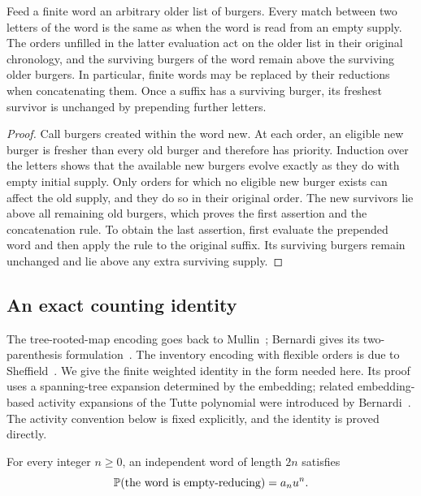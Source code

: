 \begin{lemma}\label{word:reduction}
Feed a finite word an arbitrary older list of burgers. Every match
between two letters of the word is the same as when the word is read
from an empty supply. The orders unfilled in the latter evaluation act
on the older list in their original chronology, and the surviving burgers
of the word remain above the surviving older burgers. In particular,
finite words may be replaced by their reductions when concatenating
them. Once a suffix has a surviving burger, its freshest survivor is
unchanged by prepending further letters.
\end{lemma}

\begin{proof}
Call burgers created within the word new. At each order, an eligible new
burger is fresher than every old burger and therefore has priority.
Induction over the letters shows that the available new burgers evolve
exactly as they do with empty initial supply. Only orders for which no
eligible new burger exists can affect the old supply, and they do so in
their original order. The new survivors lie above all remaining old
burgers, which proves the first assertion and the concatenation rule.
To obtain the last assertion, first evaluate the prepended word and then
apply the rule to the original suffix. Its surviving burgers remain
unchanged and lie above any extra surviving supply.
\end{proof}

\subsection{An exact counting identity}

The tree-rooted-map encoding goes back to Mullin~\cite{Mullin1967};
Bernardi gives its two-parenthesis formulation~\cite{Bernardi2007}.
The inventory encoding with flexible orders is due to
Sheffield~\cite[Section~4]{Sheffield2016}.
We give the finite weighted identity in the form needed here. Its proof
uses a spanning-tree expansion determined by the embedding; related
embedding-based activity expansions of the Tutte polynomial were
introduced by Bernardi~\cite{Bernardi2008}. The activity convention below
is fixed explicitly, and the identity is proved directly.

\begin{proposition}\label{word:identity}
For every integer $n\ge0$, an independent word of length $2n$ satisfies
\begin{equation}\label{word:identity-equation}
 \P(\text{the word is empty-reducing})=a_nu^n.
\end{equation}
\end{proposition}

